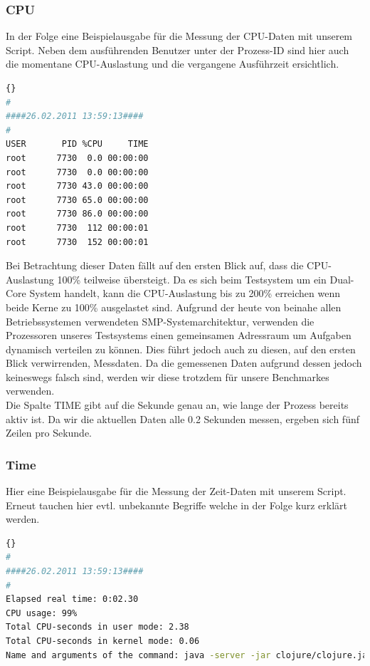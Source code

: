 \documentclass{fancydocument}
\begin{document}
\subsubsection{CPU}
In der Folge eine Beispielausgabe für die  Messung der CPU-Daten mit unserem Script. Neben dem ausführenden Benutzer unter der Prozess-ID sind hier auch die momentane CPU-Auslastung und die vergangene Ausführzeit ersichtlich.

\begin{minipage}{\textwidth}
\begin{lstlisting}[language=bash,caption=Speicherdaten]{}
#
####26.02.2011 13:59:13####
#
USER       PID %CPU     TIME
root      7730  0.0 00:00:00
root      7730  0.0 00:00:00
root      7730 43.0 00:00:00
root      7730 65.0 00:00:00
root      7730 86.0 00:00:00
root      7730  112 00:00:01
root      7730  152 00:00:01
\end{lstlisting}
\end{minipage}

Bei Betrachtung dieser Daten fällt auf den ersten Blick auf, dass die CPU-Auslastung 100\% teilweise übersteigt. Da es sich beim Testsystem um ein Dual-Core System handelt, kann die CPU-Auslastung bis zu 200\% erreichen wenn beide Kerne zu 100\% ausgelastet sind. Aufgrund der heute von beinahe allen Betriebssystemen verwendeten SMP-Systemarchitektur, verwenden die Prozessoren unseres Testsystems einen gemeinsamen Adressraum um Aufgaben dynamisch verteilen zu können. Dies führt jedoch auch zu diesen, auf den ersten Blick verwirrenden, Messdaten. Da die gemessenen Daten aufgrund dessen jedoch keineswegs falsch sind, werden wir diese trotzdem für unsere Benchmarkes verwenden.
\\
Die Spalte TIME gibt auf die Sekunde genau an, wie lange der Prozess bereits aktiv ist. Da wir die aktuellen Daten alle 0.2 Sekunden messen, ergeben sich fünf Zeilen pro Sekunde.

\subsubsection{Time}

Hier eine Beispielausgabe für die Messung der Zeit-Daten mit unserem Script. Erneut tauchen hier evtl. unbekannte Begriffe welche in der Folge kurz erklärt werden.

\begin{minipage}{\textwidth}
\begin{lstlisting}[language=bash,caption=Speicherdaten]{}
#
####26.02.2011 13:59:13####
#
Elapsed real time: 0:02.30
CPU usage: 99%
Total CPU-seconds in user mode: 2.38
Total CPU-seconds in kernel mode: 0.06
Name and arguments of the command: java -server -jar clojure/clojure.jar
\end{lstlisting}
\end{minipage}
\end{document}

